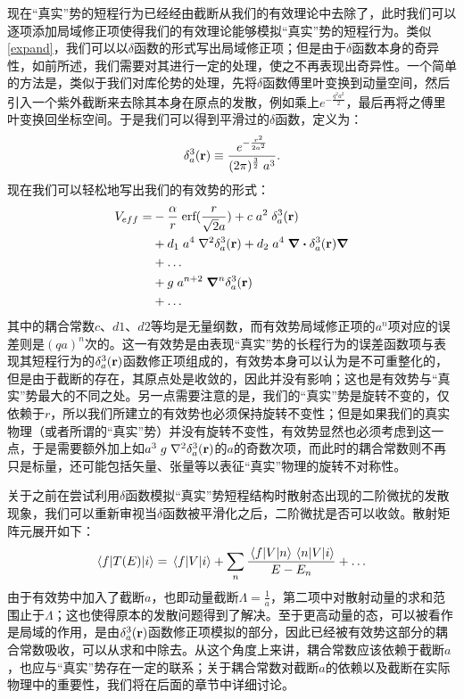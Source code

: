 \documentclass[cs4size,titlepage,twoside]{ctexart}
\begin{document}
现在“真实”势的短程行为已经经由截断从我们的有效理论中去除了，此时我们可以逐项添加局域修正项使得我们的有效理论能够模拟“真实”势的短程行为。类似\eqref{expand}，我们可以以$\delta$函数的形式写出局域修正项；但是由于$\delta$函数本身的奇异性，如前所述，我们需要对其进行一定的处理，使之不再表现出奇异性。一个简单的方法是，类似于我们对库伦势的处理，先将$\delta$函数傅里叶变换到动量空间，然后引入一个紫外截断来去除其本身在原点的发散，例如乘上$\displaystyle e^{-\frac{ q^2a^2 }{2}}$，最后再将之傅里叶变换回坐标空间。于是我们可以得到平滑过的$\delta$函数\cite{Lepage}，定义为：
\begin{equation}\label{smeardelta}
	\delta_a^3(\vb{r})\equiv\frac{e^{-\frac{r^2}{2a^2}}}{(2\pi)^{\frac{3}{2}}\;a^3}.
\end{equation}
现在我们可以轻松地写出我们的有效势的形式：
\begin{align}\label{Veff}
	\nonumber V_{eff} = & -\frac{\alpha}{r}\;\text{erf}(\frac{r}{\sqrt{2}a})+c\; a^2\;\delta_a^3(\vb{r})    \\
	\nonumber           & +d_1\;a^4\;\laplacian{\delta_a^3(\vb{r})}+d_2\;a^4\;\div{\delta_a^3(\vb{r})}\grad \\
	\nonumber           & +\dots                                                                            \\
	\nonumber           & +g\;a^{n+2}\;\grad^n\delta_a^3(\vb{r})                                            \\
	                    & +\dots
\end{align}
其中的耦合常数$c$、$d1$、$d2$等均是无量纲数，而有效势局域修正项的$a^n$项对应的误差则是$(qa)^n$次的。这一有效势是由表现“真实”势的长程行为的误差函数项与表现其短程行为的$\delta_a^3(\vb{r})$函数修正项组成的，有效势本身可以认为是不可重整化的，但是由于截断的存在，其原点处是收敛的，因此并没有影响；这也是有效势与“真实”势最大的不同之处。另一点需要注意的是，我们的“真实”势是旋转不变的，仅依赖于$r$，所以我们所建立的有效势也必须保持旋转不变性；但是如果我们的真实物理（或者所谓的“真实”势）并没有旋转不变性，有效势显然也必须考虑到这一点，于是需要额外加上如$a^3\;g\;\laplacian\delta_a^3(\vb{r})$的$a$的奇数次项，而此时的耦合常数则不再只是标量，还可能包括矢量、张量等以表征“真实”物理的旋转不对称性。

关于之前在尝试利用$\delta$函数模拟“真实”势短程结构时散射态出现的二阶微扰的发散现象，我们可以重新审视当$\delta$函数被平滑化之后，二阶微扰是否可以收敛。散射矩阵元展开如下：
\begin{equation}
	\mel{f}{T(E)}{i}=\mel{f}{V}{i}+\sum_{n}\frac{\mel{f}{V}{n}\mel{n}{V}{i}}{E-E_n}+\dots
\end{equation}
由于有效势中加入了截断$a$，也即动量截断$\Lambda=\displaystyle\frac{1}{a}$，第二项中对散射动量的求和范围止于$\Lambda$；这也使得原本的发散问题得到了解决。至于更高动量的态，可以被看作是局域的作用，是由$\delta_a^3(\vb{r})$函数修正项模拟的部分，因此已经被有效势这部分的耦合常数吸收，可以从求和中除去。从这个角度上来讲，耦合常数应该依赖于截断$a$，也应与“真实”势存在一定的联系；关于耦合常数对截断$a$的依赖以及截断在实际物理中的重要性，我们将在后面的章节中详细讨论。
\end{document}
